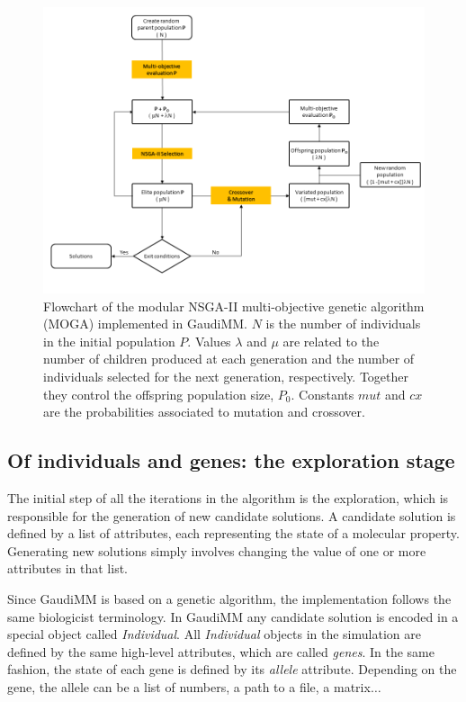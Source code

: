 \begin{figure} %
	\vspace*{-1cm}
	\includegraphics[width=0.9\textheight,angle=90]{./figures/04/nsga.png}
	\cprotect\caption[NSGA-II algorithm]{Flowchart of the modular NSGA-II multi-objective genetic algorithm (MOGA) implemented in GaudiMM. $ N $ is the number of individuals in the initial population $P$. Values $\lambda$ and $\mu$ are related to the number of children produced at each generation and the number of individuals selected for the next generation, respectively. Together they control the offspring population size, $ P_{0} $. Constants $ mut $ and $ cx $ are the probabilities associated to mutation and crossover.}
	\label{fig:nsga}
\end{figure}


\subsection{Of individuals and genes: the exploration stage}
The initial step of all the iterations in the algorithm is the exploration, which is responsible for the generation of new candidate solutions. A candidate solution is defined by a list of attributes, each representing the state of a molecular property. Generating new solutions simply involves changing the value of one or more attributes in that list.

Since GaudiMM is based on a genetic algorithm, the implementation follows the same biologicist terminology. In GaudiMM any candidate solution is encoded in a special object called \textit{Individual}. All \textit{Individual} objects in the simulation are defined by the same high-level attributes, which are called \textit{genes}. In the same fashion, the state of each gene is defined by its \textit{allele} attribute. Depending on the gene, the allele can be a list of numbers, a path to a file, a matrix$ \ldots $

